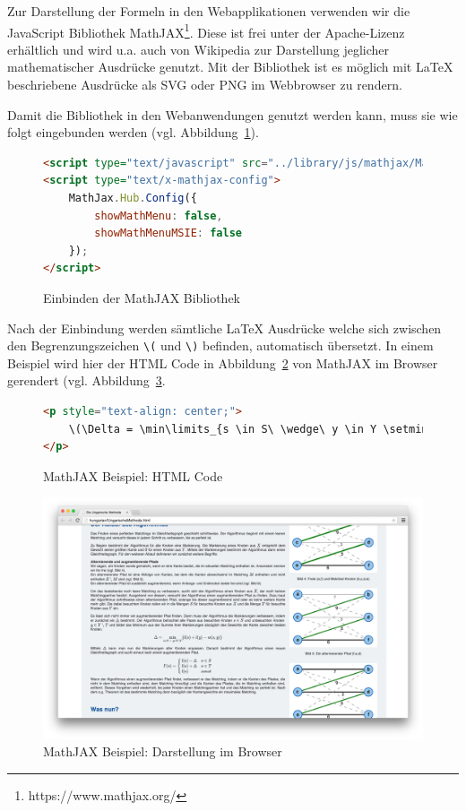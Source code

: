 Zur Darstellung der Formeln in den Webapplikationen verwenden wir die JavaScript Bibliothek MathJAX\footnote{https://www.mathjax.org/}. Diese ist frei unter der Apache-Lizenz erhältlich und wird u.a. auch von Wikipedia zur Darstellung jeglicher mathematischer Ausdrücke genutzt. Mit der Bibliothek ist es möglich mit LaTeX beschriebene Ausdrücke als SVG oder PNG im Webbrowser zu rendern. 

Damit die Bibliothek in den Webanwendungen genutzt werden kann, muss sie wie folgt eingebunden werden (vgl. Abbildung~\ref{fig:listing-mathjax-include}).

\begin{figure}[h!]
\begin{lstlisting}[language=HTML]
<script type="text/javascript" src="../library/js/mathjax/MathJax.js?config=TeX-AMS-MML_SVG.js&locale=de"></script>
<script type="text/x-mathjax-config">
	MathJax.Hub.Config({
		showMathMenu: false,
		showMathMenuMSIE: false
	});
</script>
\end{lstlisting}
\caption[MathJAX: Einbindung]{Einbinden der MathJAX Bibliothek}\label{fig:listing-mathjax-include}
\end{figure}

Nach der Einbindung werden sämtliche LaTeX Ausdrücke welche sich zwischen den Begrenzungszeichen \texttt{\textbackslash(} und \texttt{\textbackslash)} befinden, automatisch übersetzt. In einem Beispiel wird hier der HTML Code in Abbildung~\ref{fig:listing-mathjax-example-html} von MathJAX im Browser gerendert (vgl. Abbildung~\ref{fig:mathjax-example-img}.

\begin{figure}[h!]
\begin{lstlisting}[language=HTML]
<p style="text-align: center;">
	\(\Delta = \min\limits_{s \in S\ \wedge\ y \in Y \setminus T}\{l(s) + l(y) - w(s,y)\}\)
</p>
\end{lstlisting}
\caption[MathJAX: Beispiel Code]{MathJAX Beispiel: HTML Code}\label{fig:listing-mathjax-example-html}
\end{figure}

\begin{figure}[h!]
	\centering
	\includegraphics[width=\textwidth]{figures/mathjax-example}
	\caption[MathJAX: Beispiel im Browser]{MathJAX Beispiel: Darstellung im Browser}\label{fig:mathjax-example-img}
\end{figure}

